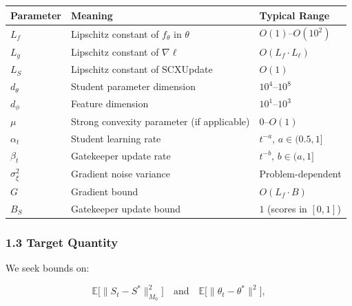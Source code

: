 \documentclass[
  12pt,
]{article}
\begin{document}
\begin{longtable}[]{@{}
  >{\raggedright\arraybackslash}p{}
  >{\raggedright\arraybackslash}p{}
  >{\raggedright\arraybackslash}p{}@{}}
\toprule\noalign{}
\begin{minipage}[b]{\linewidth}\raggedright
Parameter
\end{minipage} & \begin{minipage}[b]{\linewidth}\raggedright
Meaning
\end{minipage} & \begin{minipage}[b]{\linewidth}\raggedright
Typical Range
\end{minipage} \\
\midrule\noalign{}
\endhead
\bottomrule\noalign{}
\endlastfoot
\(L_f\) & Lipschitz constant of \(f_\theta\) in \(\theta\) &
\(O(1)\)--\(O(10^2)\) \\
\(L_g\) & Lipschitz constant of \(\nabla \ell\) &
\(O(L_f \cdot L_\ell)\) \\
\(L_S\) & Lipschitz constant of SCXUpdate & \(O(1)\) \\
\(d_\theta\) & Student parameter dimension & \(10^4\)--\(10^8\) \\
\(d_\phi\) & Feature dimension & \(10^1\)--\(10^3\) \\
\(\mu\) & Strong convexity parameter (if applicable) &
\(0\)--\(O(1)\) \\
\(\alpha_t\) & Student learning rate & \(t^{-a}\), \(a \in (0.5, 1]\) \\
\(\beta_t\) & Gatekeeper update rate & \(t^{-b}\), \(b \in (a, 1]\) \\
\(\sigma_\xi^2\) & Gradient noise variance & Problem-dependent \\
\(G\) & Gradient bound & \(O(L_f \cdot B)\) \\
\(B_S\) & Gatekeeper update bound & \(1\) (scores in \([0,1]\)) \\
\end{longtable}

\subsubsection{1.3 Target Quantity}\label{target-quantity}

We seek bounds on:

\[\mathbb{E}\bigl[\|S_t - S^*\|_{M_0}^2\bigr] \quad \text{and} \quad \mathbb{E}\bigl[\|\theta_t - \theta^*\|^2\bigr],\]
\end{document}
